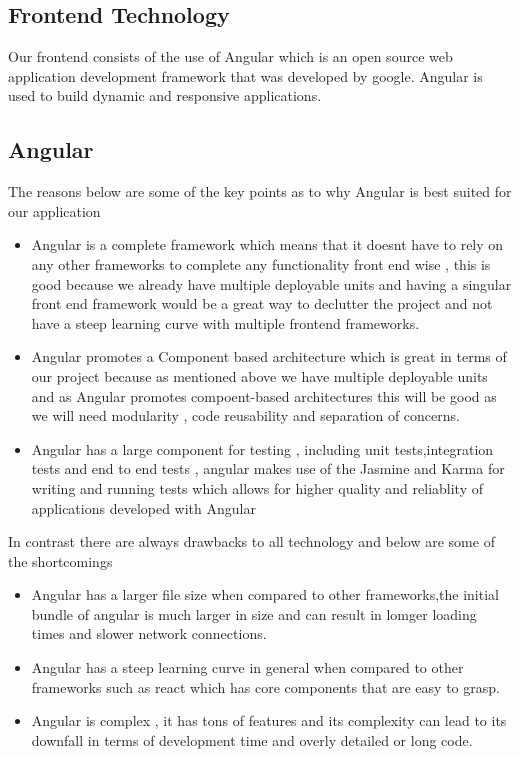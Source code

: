 \documentclass[12pt]{article}
\begin{document}
\subsection{Frontend Technology}
Our frontend consists of the use of Angular which is an open source web application development framework that was developed by google. Angular is used to build dynamic and responsive applications.
\subsection{Angular}
The reasons below are some of the key points as to why Angular is best suited for our application
\begin{itemize}
    \item Angular is a complete framework which means that it doesnt have to rely on any other frameworks to complete any functionality front end wise , this is good because we already have multiple deployable units and having a singular front end framework would be a great way to declutter the project and not have a steep learning curve with multiple frontend frameworks.
    \item Angular promotes a Component based architecture which is great in terms of our project because as mentioned above we have multiple deployable units and as Angular promotes compoent-based architectures this will be good as we will need modularity , code reusability and separation of concerns.
    \item Angular has a large component for testing , including unit tests,integration tests and end to end tests , angular makes use of the Jasmine and Karma for writing and running tests which allows for higher quality and reliablity of applications developed with Angular
\end{itemize}
In contrast there are always drawbacks to all technology and below are some of the shortcomings
\begin{itemize}
    \item Angular has a larger file size when compared to other frameworks,the initial bundle of angular is much larger in size and can result in lomger loading times and slower network connections.
    \item Angular has a steep learning curve in general when compared to other frameworks such as react which has core components that are easy to grasp.
    \item Angular is complex , it has tons of features and its complexity can lead to its downfall in terms of development time and overly detailed or long code.
\end{itemize}
\end{document}
